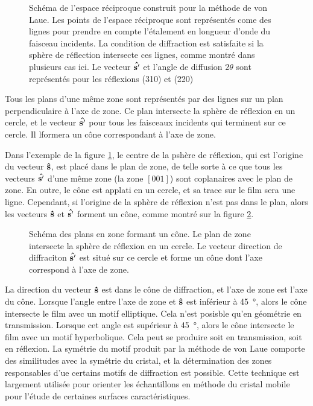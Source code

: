 \begin{figure}
    \TODO
    \caption{Schéma de l'espace réciproque construit pour la méthode de von Laue. Les points de l'espace réciproque sont représentés come des lignes pour prendre en compte l'étalement en longueur d'onde du faisceau incidents. La condition de diffraction est satisfaite si la sphère de réflection intersecte ces lignes, comme montré dans plusieurs cas ici. Le vecteur $\mathbf{\hat{s'}}$ et l'angle de diffusion $2\theta$ sont représentés pour les réflexions (310) et (220)}
    \label{fig:lauerecip}
\end{figure}

Tous les plans d'une même zone sont représentés par des lignes sur un plan perpendiculaire à l'axe de zone. Ce plan intersecte la sphère de réflexion en un cercle, et le vecteur $\mathbf{\hat{s'}}$ pour tous les faisceaux incidents qui terminent sur ce cercle. Il lformera un cône correspondant à l'axe de zone.

Dans l'exemple de la figure \ref{fig:lauerecip}, le centre de la pshère de réflexion, qui est l'origine du vecteur $\mathbf{\hat{s}}$, est placé dans le plan de zone, de telle sorte à ce que tous les vecteurs $\mathbf{\hat{s'}}$ d'une même zone (la zone $[001]$) sont coplanaires avec le plan de zone. En outre, le cône est applati en un cercle, et sa trace sur le film sera une ligne. Cependant, si l'origine de la sphère de réflexion n'est pas dans le plan, alors les vecteurs $\mathbf{\hat{s}}$ et $\mathbf{\hat{s'}}$  forment un cône, comme montré sur la figure \ref{fig:lauecone}.

\begin{figure}
    \TODO
    \caption{Schéma des plans en zone formant un cône. Le plan de zone intersecte la sphère de réflexion en un cercle. Le vecteur direction de diffraciton $\mathbf{\hat{s'}}$ est situé sur ce cercle et forme un cône dont l'axe correspond à l'axe de zone.}
    \label{fig:lauecone}
\end{figure}

La direction du vecteur $\mathbf{\hat{s}}$ est dans le cône de diffraction, et l'axe de zone est l'axe du cône. Lorsque l'angle entre l'axe de zone et $\mathbf{\hat{s}}$ est inférieur à \SI{45}{\degree}, alors le cône intersecte le film avec un motif elliptique. Cela n'est posisble qu'en géométrie en transmission. Lorsque cet angle est supérieur à \SI{45}{\degree}, alors le cône intersecte le film avec un motif hyperbolique. Cela peut se produire soit en transmission, soit en réflexion. La symétrie du motif produit par la méthode de von Laue comporte des similitudes avec la symétrie du cristal, et la détermination des zones responsables d'ue certains motifs de diffraction est possible. Cette technique est largement utilisée pour orienter les échantillons en méthode du cristal mobile pour l'étude de certaines surfaces caractéristiques.


